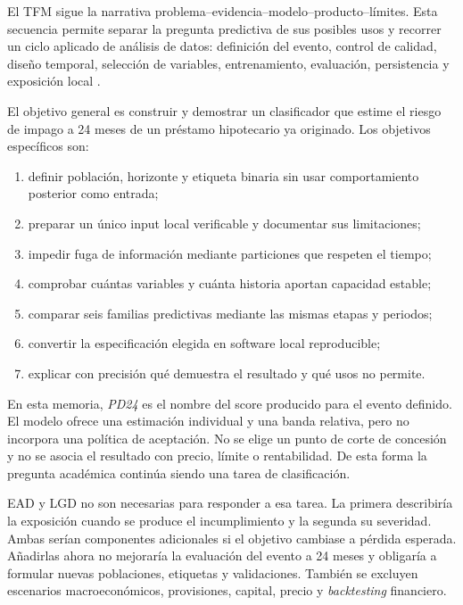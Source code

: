 \documentclass[10pt,a4paper]{article}
\begin{document}
El TFM sigue la narrativa problema--evidencia--modelo--producto--límites. Esta
secuencia permite separar la pregunta predictiva de sus posibles usos y recorrer
un ciclo aplicado de análisis de datos: definición del evento, control de
calidad, diseño temporal, selección de variables, entrenamiento, evaluación,
persistencia y exposición local \cite{guia-tfm}.

El objetivo general es construir y demostrar un clasificador que estime el
riesgo de impago a 24 meses de un préstamo hipotecario ya originado. Los
objetivos específicos son:

\begin{enumerate}
\item definir población, horizonte y etiqueta binaria sin usar comportamiento
posterior como entrada;
\item preparar un único input local verificable y documentar sus limitaciones;
\item impedir fuga de información mediante particiones que respeten el tiempo;
\item comprobar cuántas variables y cuánta historia aportan capacidad estable;
\item comparar seis familias predictivas mediante las mismas etapas y periodos;
\item convertir la especificación elegida en software local reproducible;
\item explicar con precisión qué demuestra el resultado y qué usos no permite.
\end{enumerate}

En esta memoria, \emph{PD24} es el nombre del score producido para el evento
definido. El modelo ofrece una estimación individual y una banda relativa, pero
no incorpora una política de aceptación. No se elige un punto de corte de
concesión y no se asocia el resultado con precio, límite o rentabilidad. De esta
forma la pregunta académica continúa siendo una tarea de clasificación.

EAD y LGD no son necesarias para responder a esa tarea. La primera describiría
la exposición cuando se produce el incumplimiento y la segunda su severidad.
Ambas serían componentes adicionales si el objetivo cambiase a pérdida
esperada. Añadirlas ahora no mejoraría la evaluación del evento a 24 meses y
obligaría a formular nuevas poblaciones, etiquetas y validaciones. También se
excluyen escenarios macroeconómicos, provisiones, capital, precio y
\emph{backtesting} financiero.
\end{document}
